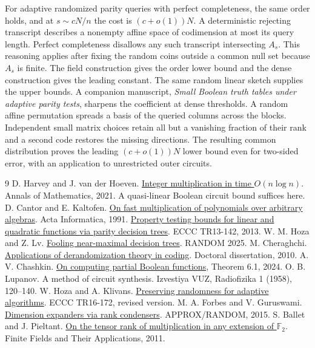 \documentclass[11pt]{article}
\begin{document}
For adaptive randomized parity queries with perfect completeness, the same order holds, and at $s\sim cN/n$ the cost is $(c+o(1))N$. A deterministic rejecting transcript describes a nonempty affine space of codimension at most its query length. Perfect completeness disallows any such transcript intersecting $A_s$. This reasoning applies after fixing the random coins outside a common null set because $A_s$ is finite. The field construction gives the order lower bound and the dense construction gives the leading constant. The same random linear sketch supplies the upper bounds.
A companion manuscript, \emph{Small Boolean truth tables under adaptive parity tests}, sharpens the coefficient at dense thresholds. A random affine permutation spreads a basis of the queried columns across the blocks. Independent small matrix choices retain all but a vanishing fraction of their rank and a second code restores the missing directions. The resulting common distribution proves the leading $(c+o(1))N$ lower bound even for two-sided error, with an application to unrestricted outer circuits.




\begin{thebibliography}{9}
 D. Harvey and J. van der Hoeven. \href{https://doi.org/10.4007/annals.2021.193.2.4}{Integer multiplication in time $O(n\log n)$}. Annals of Mathematics, 2021. A quasi-linear Boolean circuit bound suffices here.
 D. Cantor and E. Kaltofen. \href{https://kaltofen.math.ncsu.edu/bibliography/91/CaKa91.pdf}{On fast multiplication of polynomials over arbitrary algebras}. Acta Informatica, 1991.
 \href{https://eccc.weizmann.ac.il/report/2013/142/}{Property testing bounds for linear and quadratic functions via parity decision trees}. ECCC TR13-142, 2013.
 W. M. Hoza and Z. Lv. \href{https://doi.org/10.4230/LIPIcs.APPROX/RANDOM.2025.35}{Fooling near-maximal decision trees}. RANDOM 2025.
 M. Cheraghchi. \href{https://arxiv.org/abs/1107.4709}{Applications of derandomization theory in coding}. Doctoral dissertation, 2010.
 A. V. Chashkin. \href{https://keldysh.ru/papers/2024/mvk/mvk2024_152.pdf}{On computing partial Boolean functions}, Theorem 6.1, 2024.
 O. B. Lupanov. A method of circuit synthesis. Izvestiya VUZ, Radiofizika 1 (1958), 120--140.
 W. Hoza and A. Klivans. \href{https://eccc.weizmann.ac.il/report/2016/172/}{Preserving randomness for adaptive algorithms}. ECCC TR16-172, revised version.
 M. A. Forbes and V. Guruswami. \href{https://arxiv.org/abs/1411.7455}{Dimension expanders via rank condensers}. APPROX/RANDOM, 2015.
 S. Ballet and J. Pieltant. \href{https://arxiv.org/abs/1003.1864}{On the tensor rank of multiplication in any extension of $\mathbb F_2$}. Finite Fields and Their Applications, 2011.
\end{thebibliography}
\end{document}
